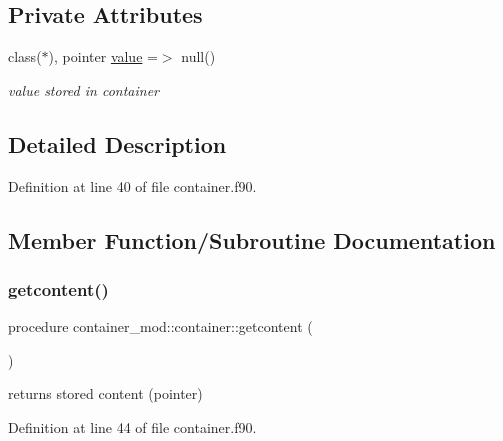 \subsection*{Private Attributes}
\begin{DoxyCompactItemize}
\item 
class($\ast$), pointer \mbox{\hyperlink{structcontainer__mod_1_1container_a297f4632156bf226aa8599a7f0cd55c0}{value}} =$>$ null()
\begin{DoxyCompactList}\small\item\em value stored in container \end{DoxyCompactList}\end{DoxyCompactItemize}


\subsection{Detailed Description}


Definition at line 40 of file container.\+f90.



\subsection{Member Function/\+Subroutine Documentation}
\mbox{\label{structcontainer__mod_1_1container_abe1540dea98e715a935b91c662a2d81a}} 
\subsubsection{\texorpdfstring{getcontent()}{getcontent()}}
{\footnotesize\ttfamily procedure container\+\_\+mod\+::container\+::getcontent (\begin{DoxyParamCaption}{ }\end{DoxyParamCaption})\hspace{0.3cm}{\ttfamily [private]}}



returns stored content (pointer) 



Definition at line 44 of file container.\+f90.

\mbox{\label{structcontainer__mod_1_1container_ac62ed00e4c79b7c758a5efbc9cc1909a}} 

